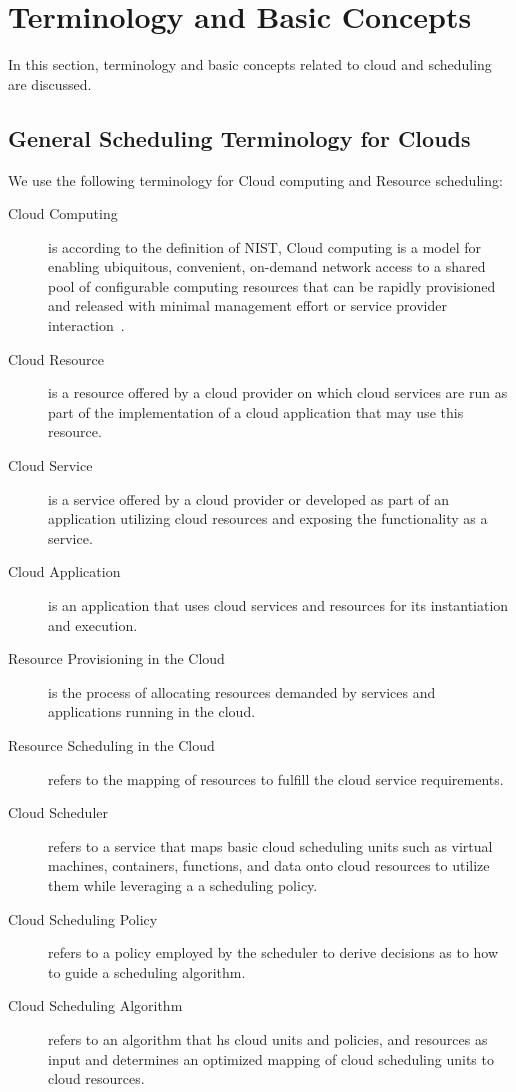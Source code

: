 \documentclass[final,5p,times,twocolumn]{elsarticle}
\begin{document}
\section{Terminology and Basic Concepts}\label{sec:terminology}

In this section, terminology and basic concepts related to cloud and
scheduling are discussed.

\subsection{General Scheduling Terminology for Clouds}

We use the following terminology for Cloud computing and Resource scheduling:

\begin{description}

\item[Cloud Computing] is according to the definition of NIST, Cloud computing
  is a model for enabling ubiquitous, convenient, on-demand network
  access to a shared pool of configurable computing resources that can
  be rapidly provisioned and released with minimal management effort
  or service provider interaction~\cite{mell2011nist}.

\item[Cloud Resource] is a resource offered by a cloud provider on
  which cloud services are run as part of the implementation of a
  cloud application that may use this resource.

\item[Cloud Service] is a service offered by a cloud provider or
  developed as part of an application utilizing cloud resources and
  exposing the functionality as a service.
  
\item[Cloud Application] is an application that uses cloud services
  and resources for its instantiation and execution.

\item[Resource Provisioning in the Cloud] is the process of allocating 
  resources demanded by services and applications running in the cloud.
  
\item[Resource Scheduling in the Cloud] refers to the mapping of
  resources to fulfill the cloud service requirements.

\item[Cloud Scheduler] refers to a service that maps basic cloud
  scheduling units such as virtual machines, containers, functions,
  and data onto cloud resources to utilize them while leveraging a 
 a scheduling policy. 

\item[Cloud Scheduling Policy] refers to a policy employed by the
  scheduler to derive decisions as to how to guide a scheduling
  algorithm.

\item[Cloud Scheduling Algorithm] refers to an algorithm that hs cloud
  units and policies, and resources as input and determines an
  optimized mapping of cloud scheduling units to cloud resources.
  
\end{description}
\end{document}
